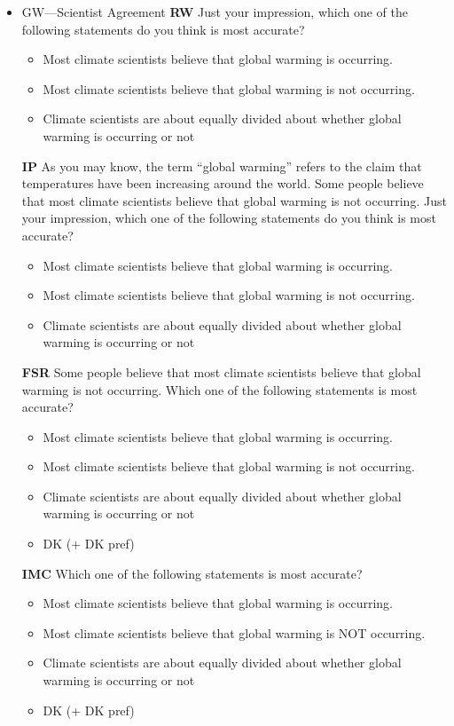 \begin{itemize}
\item GW—Scientist Agreement\newline
\textbf{RW}\newline
Just your impression, which one of the following statements do you think is most
accurate?
\begin{itemize}
	\item Most climate scientists believe that global warming is occurring.
	\item Most climate scientists believe that global warming is not occurring.
	\item Climate scientists are about equally divided about whether global warming is occurring or not
\end{itemize}

\textbf{IP}\newline
As you may know, the term ``global warming'' refers to the claim that temperatures
have been increasing around the world. Some people believe that most climate
scientists believe that global warming is not occurring. Just your impression, which
one of the following statements do you think is most accurate?
\begin{itemize}
	\item Most climate scientists believe that global warming is occurring.
	\item Most climate scientists believe that global warming is not occurring.
	\item Climate scientists are about equally divided about whether global warming is occurring or not
\end{itemize}
\textbf{FSR}\newline
Some people believe that most climate scientists believe that global warming is not
occurring. Which one of the following statements is most accurate?
\begin{itemize}
	\item Most climate scientists believe that global warming is occurring.
	\item Most climate scientists believe that global warming is not occurring.
	\item Climate scientists are about equally divided about whether global warming is occurring or not
	\item DK (+ DK pref)
\end{itemize}

\textbf{IMC}\newline
Which one of the following statements is most accurate?
\begin{itemize}
	\item Most climate scientists believe that global warming is occurring.
	\item Most climate scientists believe that global warming is NOT occurring.
	\item Climate scientists are about equally divided about whether global warming is occurring or not
	\item DK (+ DK pref)
\end{itemize}


\end{itemize}
